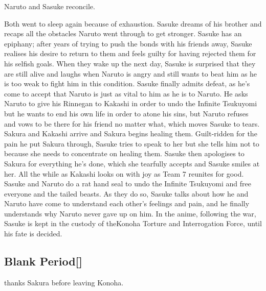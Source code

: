 \documentclass[a4paper,12pt]{article}
\begin{document}
Naruto and Sasuke reconcile.\\ \par \vspace{0.5cm}

Both went to sleep again because of exhaustion. Sasuke dreams of his brother and recaps all the obstacles Naruto went through to get stronger. Sasuke has an epiphany; after years of trying to push the bonds with his friends away, Sasuke realises his desire to return to them and feels guilty for having rejected them for his selfish goals. When they wake up the next day, Sasuke is surprised that they are still alive and laughs when Naruto is angry and still wants to beat him as he is too weak to fight him in this condition. Sasuke finally admits defeat, as he's come to accept that Naruto is just as vital to him as he is to Naruto. He asks Naruto to give his Rinnegan to Kakashi in order to undo the Infinite Tsukuyomi but he wants to end his own life in order to atone his sins, but Naruto refuses and vows to be there for his friend no matter what, which moves Sasuke to tears. Sakura and Kakashi arrive and Sakura begins healing them. Guilt-ridden for the pain he put Sakura through, Sasuke tries to speak to her but she tells him not to because she needs to concentrate on healing them. Sasuke then apologises to Sakura for everything he's done, which she tearfully accepts and Sasuke smiles at her. All the while as Kakashi looks on with joy as Team 7 reunites for good. Sasuke and Naruto do a rat hand seal to undo the Infinite Tsukuyomi and free everyone and the tailed beasts. As they do so, Sasuke talks about how he and Naruto have come to understand each other's feelings and pain, and he finally understands why Naruto never gave up on him. In the anime, following the war, Sasuke is kept in the custody of theKonoha Torture and Interrogation Force, until his fate is decided.\\ \par \vspace{0.5cm}

\subsection*{Blank Period[]}\n\nSasuke thanks Sakura before leaving Konoha.\\ \par \vspace{0.5cm}
\end{document}
